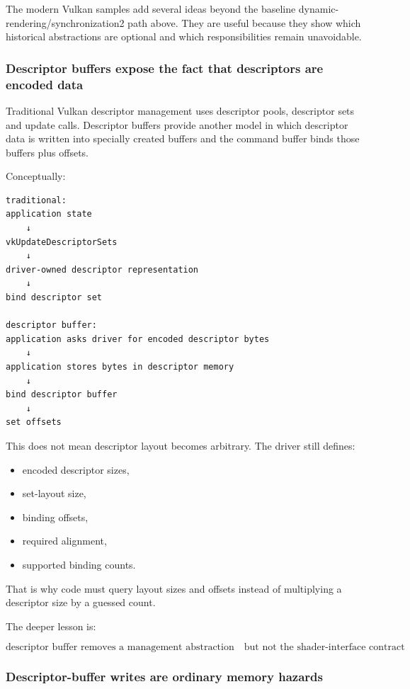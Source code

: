 The modern Vulkan samples add several ideas beyond the baseline dynamic-rendering/synchronization2 path above. They are useful because they show which historical abstractions are optional and which responsibilities remain unavoidable.

\subsubsection{Descriptor buffers expose the fact that descriptors are encoded data}\label{05-engine-i-ch023-descriptor-buffers-expose-the-fact-that-descriptors-are-encoded-data}

Traditional Vulkan descriptor management uses descriptor pools, descriptor sets and update calls. Descriptor buffers provide another model in which descriptor data is written into specially created buffers and the command buffer binds those buffers plus offsets.

Conceptually:

\begin{verbatim}
traditional:
application state
    ↓
vkUpdateDescriptorSets
    ↓
driver-owned descriptor representation
    ↓
bind descriptor set

descriptor buffer:
application asks driver for encoded descriptor bytes
    ↓
application stores bytes in descriptor memory
    ↓
bind descriptor buffer
    ↓
set offsets
\end{verbatim}

This does not mean descriptor layout becomes arbitrary. The driver still defines:

\begin{itemize}
\tightlist
\item
  encoded descriptor sizes,
\item
  set-layout size,
\item
  binding offsets,
\item
  required alignment,
\item
  supported binding counts.
\end{itemize}

That is why code must query layout sizes and offsets instead of multiplying a descriptor size by a guessed count.

The deeper lesson is:

\[
\boxed{
\text{descriptor buffer removes a management abstraction}
\quad
\text{but not the shader-interface contract}
}
\]

\subsubsection{Descriptor-buffer writes are ordinary memory hazards}\label{05-engine-i-ch023-descriptor-buffer-writes-are-ordinary-memory-hazards}

